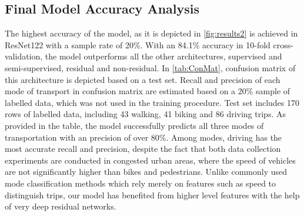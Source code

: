  
\subsection{Final Model Accuracy Analysis}
The highest accuracy of the model, as it is depicted in \cref{fig:results2} is achieved in ResNet122 with a sample rate of 20\%. With an 84.1\% accuracy in 10-fold cross-validation, the model outperforms all the other architectures, supervised and semi-supervised, residual and non-residual. In \cref{tab:ConMat}, confusion matrix of this architecture is depicted based on a test set. Recall and precision of each mode of transport in confusion matrix are estimated based on a 20\% sample of labelled data, which was not used in the training procedure. Test set includes 170 rows of labelled data, including 43 walking, 41 biking and 86 driving trips. As provided in the table, the model successfully predicts all three modes of transportation with an precision of over 80\%. Among modes, driving has the most accurate recall and precision, despite the fact that both data collection experiments are conducted in congested urban areas, where the speed of vehicles are not significantly higher than bikes and pedestrians. Unlike commonly used mode classification methods which rely merely on features such as speed to distinguish trips, our model has benefited from higher level features with the help of very deep residual networks.


